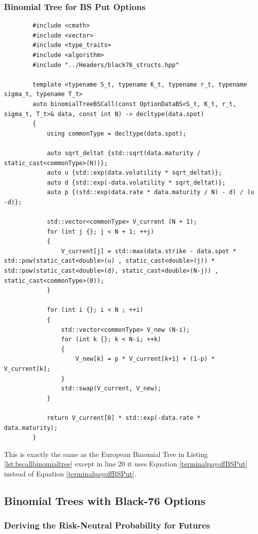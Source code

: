 \documentclass[12pt]{article}
\numberwithin{equation}{section}
\begin{document}
\subsubsection{Binomial Tree for BS Put Options}
\begin{listing}[H]
	\begin{verbatim}
		#include <cmath>
		#include <vector>
		#include <type_traits>
		#include <algorithm>
		#include "../Headers/black76_structs.hpp"
		
		template <typename S_t, typename K_t, typename r_t, typename sigma_t, typename T_t>
		auto binomialTreeBSCall(const OptionDataBS<S_t, K_t, r_t, sigma_t, T_t>& data, const int N) -> decltype(data.spot)
		{
			using commonType = decltype(data.spot);
			
			auto sqrt_deltat {std::sqrt(data.maturity / static_cast<commonType>(N))};
			auto u {std::exp(data.volatility * sqrt_deltat)};
			auto d {std::exp(-data.volatility * sqrt_deltat)};
			auto p {(std::exp(data.rate * data.maturity / N) - d) / (u -d)};
			
			std::vector<commonType> V_current (N + 1);
			for (int j {}; j < N + 1; ++j)
			{
				V_current[j] = std::max(data.strike - data.spot * std::pow(static_cast<double>(u) , static_cast<double>(j)) * std::pow(static_cast<double>(d), static_cast<double>(N-j)) , static_cast<commonType>(0));
			}
			
			for (int i {}; i < N ; ++i)
			{
				std::vector<commonType> V_new (N-i);
				for (int k {}; k < N-i; ++k)
				{
					V_new[k] = p * V_current[k+1] + (1-p) * V_current[k];
				}
				std::swap(V_current, V_new);
			}   
			
			return V_current[0] * std::exp(-data.rate * data.maturity);
		}
	\end{verbatim}
	\caption{Black-Scholes-Merton Put using Monte Carlo Simulations}
	\label{lst:bsbinomialtree}
\end{listing}
This is exactly the same as the European Binomial Tree in Listing \ref{lst:bscallbinomialtree} except in line 20 it uses Equation \ref{terminalpayoffBSPut} instead of Equation \ref{terminalpayoffBSPut}.
\subsection{Binomial Trees with Black-76 Options}
\subsubsection{Deriving the Risk-Neutral Probability for Futures}
\end{document}
